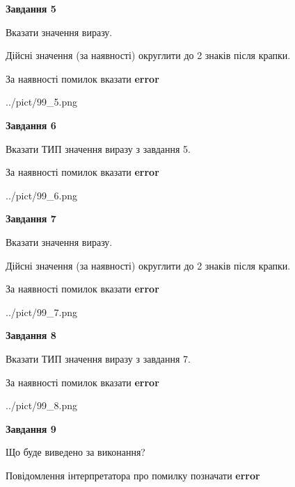 \documentclass[11pt, ukrainian]{article}
\begin{document}
{\begin {large}
{\begin {center}\textbf{Завдання 5}\end {center}}\par
Вказати значення виразу. \par
Дійсні значення (за наявності) округлити до 2 знаків після крапки. \par
За наявності помилок вказати \textbf{error}

\begin{center}
	{../pict/99_5.png}
\end{center}
\newpage

{\begin {center}\textbf{Завдання 6}\end {center}}\par
Вказати ТИП значення виразу з завдання 5. \par
За наявності помилок вказати \textbf{error}

\begin{center}
	{../pict/99_6.png}
\end{center}
\newpage

{\begin {center}\textbf{Завдання 7}\end {center}}\par
Вказати значення виразу. \par
Дійсні значення (за наявності) округлити до 2 знаків після крапки. \par
За наявності помилок вказати \textbf{error}

\begin{center}
	{../pict/99_7.png}
\end{center}
\newpage

{\begin {center}\textbf{Завдання 8}\end {center}}\par
Вказати ТИП значення виразу з завдання 7. \par
За наявності помилок вказати \textbf{error}

\begin{center}
	{../pict/99_8.png}
\end{center}
\newpage

{\begin {center}\textbf{Завдання 9}\end {center}}\par
Що буде виведено за виконання? \par
Повідомлення інтерпретатора про помилку позначати \textbf{error}


\end{large}}
\end{document}
